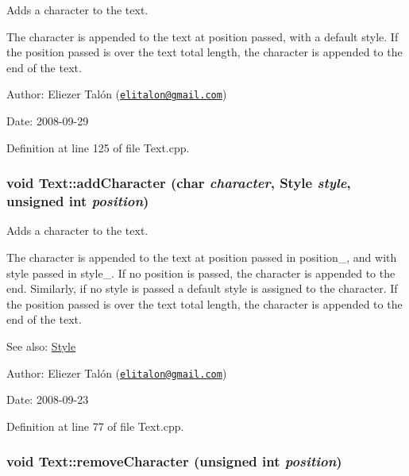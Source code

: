Adds a character to the text. 

The character is appended to the text at position passed, with a default style. If the position passed is over the text total length, the character is appended to the end of the text.

\begin{Desc}
\item[Author:]Eliezer Talón (\href{mailto:elitalon@gmail.com}{\tt elitalon@gmail.com}) \end{Desc}
\begin{Desc}
\item[Date:]2008-09-29 \end{Desc}


Definition at line 125 of file Text.cpp.\hypertarget{class_text_a2074d216bde350970d9a4260c2d85bb}{
\subsubsection[addCharacter]{\setlength{\rightskip}{0pt plus 5cm}void Text::addCharacter (char {\em character}, \/  {\bf Style} {\em style}, \/  unsigned int {\em position})}}
\label{class_text_a2074d216bde350970d9a4260c2d85bb}


Adds a character to the text. 

The character is appended to the text at position passed in position\_\-, and with style passed in style\_\-. If no position is passed, the character is appended to the end. Similarly, if no style is passed a default style is assigned to the character. If the position passed is over the text total length, the character is appended to the end of the text.

\begin{Desc}
\item[See also:]\hyperlink{class_style}{Style}\end{Desc}
\begin{Desc}
\item[Author:]Eliezer Talón (\href{mailto:elitalon@gmail.com}{\tt elitalon@gmail.com}) \end{Desc}
\begin{Desc}
\item[Date:]2008-09-23 \end{Desc}


Definition at line 77 of file Text.cpp.\hypertarget{class_text_d62cf2b09042cfd169b8274ef3226fbd}{
\subsubsection[removeCharacter]{\setlength{\rightskip}{0pt plus 5cm}void Text::removeCharacter (unsigned int {\em position})}}
\label{class_text_d62cf2b09042cfd169b8274ef3226fbd}


